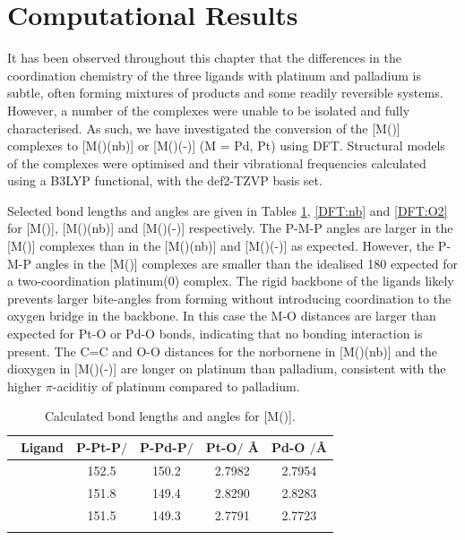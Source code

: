 
\section{Computational Results}

It has been observed throughout this chapter that the differences in the coordination chemistry of the three \tBuxantphos{} ligands with platinum and palladium is subtle, often forming mixtures of products and some readily reversible systems.  However, a number of the complexes were unable to be isolated and fully characterised.  As such, we have investigated the conversion of the [M(\tBuxantphos)] complexes to [M(\tBuxantphos)(nb)] or [M(\tBuxantphos)(-)] (M = Pd, Pt) using \gls{DFT}.  Structural models of the complexes were optimised and their vibrational frequencies calculated using a B3LYP functional,\cite{Becke1993, Lee1988, Vosko1980, Stephens1994} with the def2-TZVP basis set.\cite{Andrae1990, Weigend2005}  

Selected bond lengths and angles are given in Tables \ref{DFT:14}, \ref{DFT:nb} and \ref{DFT:O2} for [M(\tBuxantphos)], [M(\tBuxantphos)(nb)] and [M(\tBuxantphos)(-)] respectively.  The P-M-P angles are larger in the [M(\tBuxantphos)] complexes than in the [M(\tBuxantphos)(nb)] and [M(\tBuxantphos)(-)] as expected.  However, the P-M-P angles in the [M(\tBuxantphos)] complexes are smaller than the idealised 180\degrees{} expected for a two-coordination platinum(0) complex.  The rigid backbone of the \tBuxantphos{} ligands likely prevents larger bite-angles from forming without introducing coordination to the oxygen bridge in the backbone.  In this case the M-O distances are larger than expected for Pt-O or Pd-O bonds, indicating that no bonding interaction is present.  The C=C and O-O distances for the norbornene in [M(\tBuxantphos)(nb)] and the dioxygen in [M(\tBuxantphos)(-)] are longer on platinum than palladium, consistent with the higher $\pi$-aciditiy of platinum compared to palladium.\cite{Chianese2007}


\begin{table}[htbp]
\caption[Calculated bond lengths and angles for [M(\tBuxantphos){]}]{Calculated bond lengths and angles for [M(\tBuxantphos){]}.}
\vspace{1em}
\label{DFT:14}
\small
\begin{center}
\begin{tabular}{l c c c c}
	\toprule
	~\bfseries{Ligand} & \bfseries{P-Pt-P$/$\degrees{}} & \bfseries{P-Pd-P$/$\degrees{}} & \bfseries{Pt-O$/$ \si{\angstrom}} & \bfseries{Pd-O $/$\si{\angstrom}}\\
	\midrule		
	~\tBuSixantphos	& 152.5 & 150.2 & 2.7982 & 2.7954\\
	~\tBuThixantphos	& 151.8 & 149.4 & 2.8290 & 2.8283\\
	~\tBuXantphos{}	& 151.5 & 149.3 & 2.7791 & 2.7723\\
	\bottomrule{}
\end{tabular}
\end{center}
\end{table}


